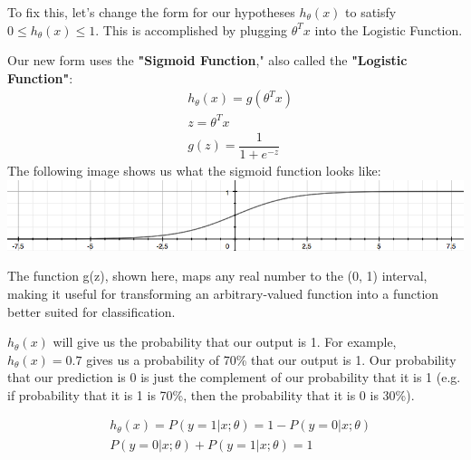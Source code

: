 \documentclass{article}
\begin{document}
To fix this, let’s change the form for our hypotheses $h_\theta (x)$ to satisfy $0 \leq h_\theta (x) \leq 1$. This is accomplished by plugging $\theta^Tx$ into the Logistic Function.

Our new form uses the \textbf{"Sigmoid Function}," also called the \textbf{"Logistic Function"}:
\begin{align*}& h_\theta (x) = g ( \theta^T x ) \\ & z = \theta^T x \\& g(z) = \dfrac{1}{1 + e^{-z}}\end{align*}
The following image shows us what the sigmoid function looks like:\\
\includegraphics[width=\textwidth]{Logistic_function}

The function g(z), shown here, maps any real number to the (0, 1) interval, making it useful for transforming an arbitrary-valued function into a function better suited for classification.

$h_\theta(x)$ will give us the probability that our output is 1. For example, $h_\theta(x)=0.7$ gives us a probability of 70\% that our output is 1. Our probability that our prediction is 0 is just the complement of our probability that it is 1 (e.g. if probability that it is 1 is 70\%, then the probability that it is 0 is 30\%).

\begin{align*}& h_\theta(x) = P(y=1 | x ; \theta) = 1 - P(y=0 | x ; \theta) \\& P(y = 0 | x;\theta) + P(y = 1 | x ; \theta) = 1\end{align*}
\end{document}
